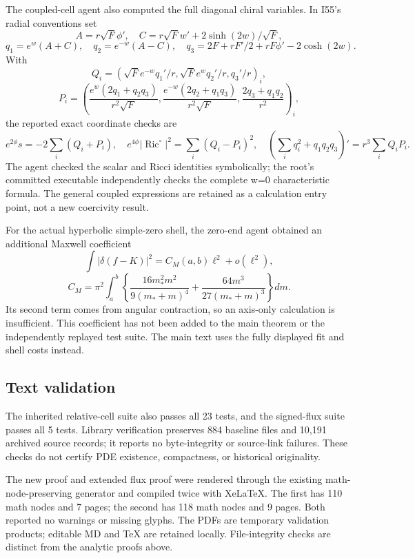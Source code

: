 \documentclass[
  10pt,
]{article}
\begin{document}
The coupled-cell agent also computed the full diagonal chiral variables.
In I55's radial conventions set \[
 A=r\sqrt F\phi',\quad C=r\sqrt Fw'+2\sinh(2w)/\sqrt F,
\] \[
 q_1=e^w(A+C),\quad q_2=e^{-w}(A-C),\quad
 q_3=2F+rF'/2+rF\phi'-2\cosh(2w).
\] With \[
 Q_i=(\sqrt F e^{-w}q_1'/r,\sqrt F e^wq_2'/r,q_3'/r)_i,
\] \[
 P_i=\left(\frac{e^w(2q_1+q_2q_3)}{r^2\sqrt F},
 \frac{e^{-w}(2q_2+q_1q_3)}{r^2\sqrt F},
 \frac{2q_3+q_1q_2}{r^2}\right)_i,
\] the reported exact coordinate checks are \[
 e^{2\phi}s=-2\sum_i(Q_i+P_i),\quad
 e^{4\phi}|\operatorname{Ric}^{\circ}|^2=\sum_i(Q_i-P_i)^2,
 \quad (\sum_iq_i^2+q_1q_2q_3)'=r^3\sum_iQ_iP_i.
\] The agent checked the scalar and Ricci identities symbolically; the
root's committed executable independently checks the complete w=0
characteristic formula. The general coupled expressions are retained as
a calculation entry point, not a new coercivity result.

For the actual hyperbolic simple-zero shell, the zero-end agent obtained
an additional Maxwell coefficient \[
 \int|\delta(f-K)|^2=C_M(a,b)\ell^2+o(\ell^2),
\] \[
 C_M=\pi^2\int_a^b\left\{
 \frac{16m_*^2m^2}{9(m_*+m)^4}
 +\frac{64m^3}{27(m_*+m)^3}\right\}dm.
\] Its second term comes from angular contraction, so an axis-only
calculation is insufficient. This coefficient has not been added to the
main theorem or the independently replayed test suite. The main text
uses the fully displayed fit and shell costs instead.

\hypertarget{text-validation}{%
\subsection{Text validation}\label{text-validation}}

The inherited relative-cell suite also passes all 23 tests, and the
signed-flux suite passes all 5 tests. Library verification preserves 884
baseline files and 10,191 archived source records; it reports no
byte-integrity or source-link failures. These checks do not certify PDE
existence, compactness, or historical originality.

The new proof and extended flux proof were rendered through the existing
math-node-preserving generator and compiled twice with XeLaTeX. The
first has 110 math nodes and 7 pages; the second has 118 math nodes and
9 pages. Both reported no warnings or missing glyphs. The PDFs are
temporary validation products; editable MD and TeX are retained locally.
File-integrity checks are distinct from the analytic proofs above.
\end{document}
